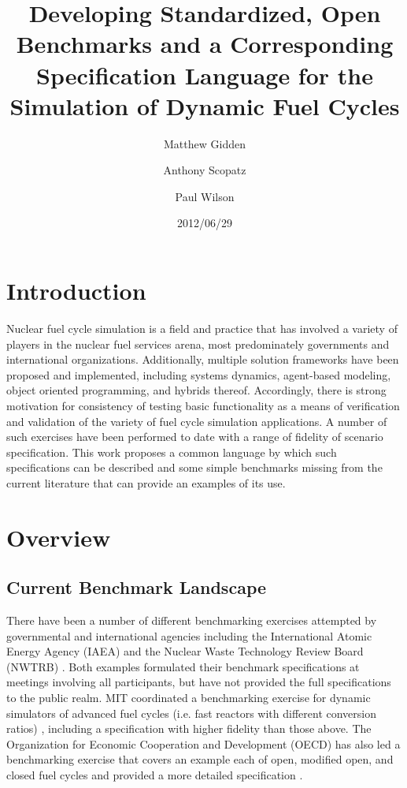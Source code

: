 \documentclass{anstrans}
\title{Developing Standardized, Open Benchmarks and a Corresponding 
Specification Language for the Simulation of Dynamic Fuel Cycles}
\author[*]{Matthew Gidden}
\author[$\dag$]{Anthony Scopatz}
\author[*]{Paul Wilson}
\affil[*]{Department of Nuclear Engineering \& Engineering Physics, 
University of Wisconsin - Madison, Madison, WI, 53703}
\affil[$\dag$]{The Flash Center for Computational Science, University 
of Chicago, Chicago, IL, 60637}
\date{2012/06/29}
\begin{document}
\section{Introduction}
Nuclear fuel cycle simulation is a field and practice that has involved a
variety of players in the nuclear fuel services arena, most predominately
governments and international organizations.  Additionally, multiple solution
frameworks have been proposed and implemented, including systems dynamics,
agent-based modeling, object oriented programming, and hybrids
thereof. Accordingly, there is strong motivation for consistency of testing
basic functionality as a means of verification and validation of the variety of
fuel cycle simulation applications. A number of such exercises have been
performed to date with a range of fidelity of scenario specification. This work
proposes a common language by which such specifications can be described and
some simple benchmarks missing from the current literature that can provide an
examples of its use.

\section{Overview}

\subsection{Current Benchmark Landscape}
There have been a number of different benchmarking exercises attempted by
governmental and international agencies including the International Atomic
Energy Agency (IAEA) \cite{_international_2011} and the Nuclear Waste Technology
Review Board (NWTRB) \cite{_nuclear_2011}.  Both examples formulated their
benchmark specifications at meetings involving all participants, but have not
provided the full specifications to the public realm. MIT coordinated a
benchmarking exercise for dynamic simulators of advanced fuel cycles (i.e. fast
reactors with different conversion ratios) \cite{guerin_benchmark_2009},
including a specification with higher fidelity than those above. The
Organization for Economic Cooperation and Development (OECD) has also led a
benchmarking exercise that covers an example each of open, modified open, and
closed fuel cycles \cite{boucher_benchmark_2012} and provided a more detailed
specification \cite{boucher_specification_2008}.
\end{document}
